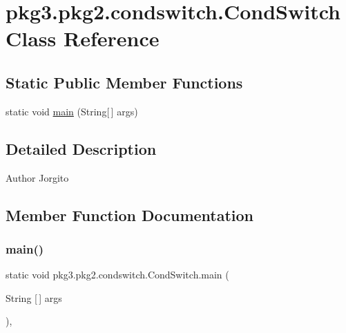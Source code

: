 \hypertarget{classpkg3_1_1pkg2_1_1condswitch_1_1_cond_switch}{}\section{pkg3.\+pkg2.\+condswitch.\+Cond\+Switch Class Reference}
\label{classpkg3_1_1pkg2_1_1condswitch_1_1_cond_switch}
\subsection*{Static Public Member Functions}
\begin{DoxyCompactItemize}
\item 
static void \mbox{\hyperlink{classpkg3_1_1pkg2_1_1condswitch_1_1_cond_switch_a10d772a021e5ad5cdc79c4a1c5c33657}{main}} (String\mbox{[}$\,$\mbox{]} args)
\end{DoxyCompactItemize}


\subsection{Detailed Description}
\begin{DoxyAuthor}{Author}
Jorgito 
\end{DoxyAuthor}


\subsection{Member Function Documentation}
\mbox{\label{classpkg3_1_1pkg2_1_1condswitch_1_1_cond_switch_a10d772a021e5ad5cdc79c4a1c5c33657}} 
\subsubsection{\texorpdfstring{main()}{main()}}
{\footnotesize\ttfamily static void pkg3.\+pkg2.\+condswitch.\+Cond\+Switch.\+main (\begin{DoxyParamCaption}\item[{String \mbox{[}$\,$\mbox{]}}]{args }\end{DoxyParamCaption})\hspace{0.3cm}{\ttfamily [inline]}, {\ttfamily [static]}}


